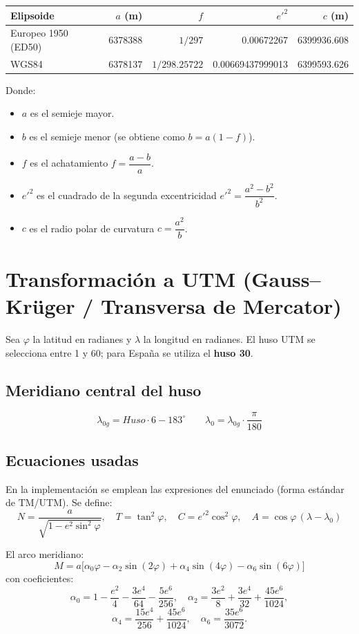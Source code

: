 \documentclass[10pt]{article}
\begin{document}
\begin{center}
\renewcommand{\arraystretch}{1.2}
\begin{tabular}{@{}lrrrr@{}}
\toprule
\textbf{Elipsoide} & $a$ (m) & $f$ & $e'^2$ & $c$ (m) \\
\midrule
Europeo 1950 (ED50) & 6378388 & $1/297$ & 0.00672267 & 6399936.608 \\
WGS84 & 6378137 & $1/298.25722$ & 0.00669437999013 & 6399593.626 \\
\bottomrule
\end{tabular}
\end{center}

Donde:
\begin{itemize}[leftmargin=1.2em]
\item $a$ es el semieje mayor.
\item $b$ es el semieje menor (se obtiene como $b=a(1-f)$).
\item $f$ es el achatamiento $f = \dfrac{a-b}{a}$.
\item $e'^2$ es el cuadrado de la segunda excentricidad $e'^2 = \dfrac{a^2-b^2}{b^2}$.
\item $c$ es el radio polar de curvatura $c = \dfrac{a^2}{b}$.
\end{itemize}

\section{Transformación a UTM (Gauss--Krüger / Transversa de Mercator)}
Sea $\varphi$ la latitud en radianes y $\lambda$ la longitud en radianes. El huso UTM se selecciona entre 1 y 60; para España se utiliza el \textbf{huso 30}.

\subsection{Meridiano central del huso}
\[
\lambda_{0g} = \textit{Huso}\cdot 6 - 183^\circ
\qquad
\lambda_0 = \lambda_{0g}\cdot \frac{\pi}{180}
\]

\subsection{Ecuaciones usadas}
En la implementación se emplean las expresiones del enunciado (forma estándar de TM/UTM). Se define:
\[
N = \frac{a}{\sqrt{1-e^2\sin^2\varphi}},\quad
T = \tan^2\varphi,\quad
C = e'^2\cos^2\varphi,\quad
A = \cos\varphi\,(\lambda-\lambda_0)
\]

El arco meridiano:
\[
M = a\Big[\alpha_0\varphi - \alpha_2\sin(2\varphi) + \alpha_4\sin(4\varphi) - \alpha_6\sin(6\varphi)\Big]
\]
con coeficientes:
\[
\alpha_0=1-\frac{e^2}{4}-\frac{3e^4}{64}-\frac{5e^6}{256},\quad
\alpha_2=\frac{3e^2}{8}+\frac{3e^4}{32}+\frac{45e^6}{1024},
\]
\[
\alpha_4=\frac{15e^4}{256}+\frac{45e^6}{1024},\quad
\alpha_6=\frac{35e^6}{3072}.
\]
\end{document}
